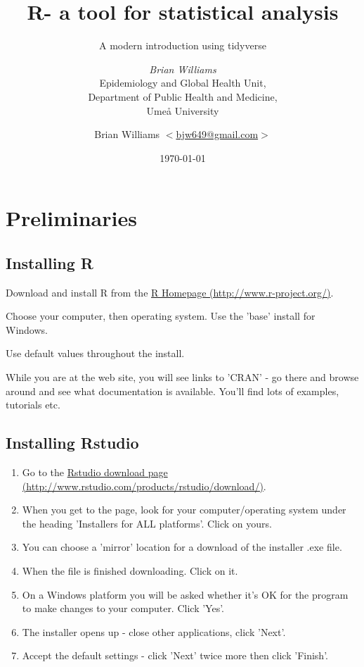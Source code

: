 \documentclass[titlepage]{book}
\title{\huge \textbf{ R- a tool for statistical analysis }\vspace{+1cm}  }
\subtitle{A modern introduction using tidyverse}
\author{{\LARGE \emph{Brian Williams}}\vspace{+1cm} \\
 Epidemiology and Global Health Unit,\\
 Department of Public Health and Medicine,\\
 Umeå University \vspace{+8cm}}
\date{\today}
\begin{document}





\chapter*{Preliminaries}

\author{Brian Williams $<$\href{mailto:bjw649@gmail.com}%
{bjw649@gmail.com}$>$}

\section*{Installing R}
Download and install R from the  \href{http://www.r-project.org/}{R Homepage (http://www.r-project.org/)}.

Choose your computer, then operating system.  Use the 'base' install for Windows.

Use default values throughout the install.

While you are at the web site, you will see links to 'CRAN' -  go there and browse around and see what documentation is available.  You'll find lots of examples, tutorials etc.

\section*{Installing Rstudio}
\begin{enumerate}
\item{Go to the \href{http://www.rstudio.com/products/rstudio/download/}{Rstudio download page (http://www.rstudio.com/products/rstudio/download/)}.}
\item{When you get to the page, look for your computer/operating system under the heading 'Installers for ALL platforms'.  Click on yours.}
\item{You can choose a 'mirror' location for a download of the installer .exe file.}
\item{When the file is finished downloading. Click on it.}
\item{On a Windows platform you will be asked whether it's OK for the program to make changes to your computer. Click 'Yes'.}
\item{The installer opens up - close other applications, click 'Next'.}
\item{Accept the default settings - click 'Next' twice more then click 'Finish'.}
\end{enumerate}
\end{document}
